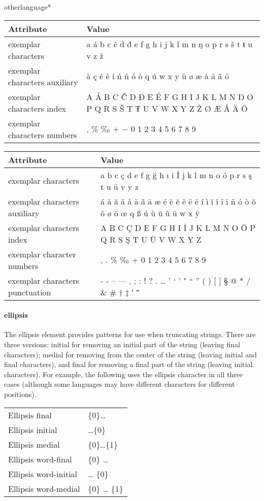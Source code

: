 \begin{docCommandd}{otherlanguage*} { }
\begin{longtable}{l p{8cm}}
\toprule
Attribute             & Value \\
\midrule
exemplar characters   & a á b c č d đ e f g h i j k l m n ŋ o p r s š t ŧ u v z ž\\
exemplar characters auxiliary  & à ç é è í ń ñ ó ò q ú w x y ü ø æ å ä ã ö\\
exemplar characters index  &A Á B C Č D Đ E É F G H I J K L M N Ŋ O P Q R S Š T Ŧ U V W X Y Z Ž Ø Æ Å Ä Ö\\
exemplar characters numbers &  , \% ‰ + − 0 1 2 3 4 5 6 7 8 9\\
\bottomrule
\end{longtable}


\begin{longtable}{l p{8cm}}
\toprule
Attribute             & Value \\
\midrule
 exemplar characters &a b c ç d e f g ğ h ı i İ j k l m n o ö p r s ş t u ü v y z\\
exemplar characters  auxiliary & á à ă â å ä ã ā æ é è ĕ ê ë ē í ì ĭ î ï ī ñ ó ò ŏ ô ø ō œ q ß ú ù ŭ û ū w x ÿ\\
 exemplar characters index & A B C Ç D E F G H I İ J K L M N O Ö P Q R S Ş T U Ü V W X Y Z\\
exemplar character numbers & \- , . \% ‰ + 0 1 2 3 4 5 6 7 8 9\\
exemplar characters punctuation &  - ‐ – — , ; : ! ? . … ' ‘ ’ " “ ” ( ) [ ] § @ * / \& \# † ‡ ′ ″\\
\bottomrule
\end{longtable}


\paragraph{ellipsis}The ellipsis element provides patterns for use when truncating strings. There are three versions: initial for removing an initial part of the string (leaving final characters); medial for removing from the center of the string (leaving initial and final characters), and final for removing a final part of the string (leaving initial characters). For example, the following uses the ellipsis character in all three cases (although some languages may have different characters for different positions).

\begin{longtable}{ll}
Ellipsis final & \{0\}… \\           
Ellipsis initial & …\{0\} \\         
Ellipsis medial  & \{0\}…\{1\} \\       
Ellipsis word-final & \{0\} … \\     
Ellipsis word-initial & … \{0\} \\   
Ellipsis word-medial & \{0\} … \{1\}\\
\end{longtable} 


\end{docCommandd}
